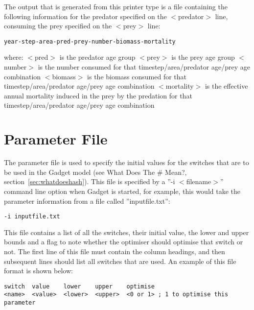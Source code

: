 \documentclass [a4paper, 10pt]{book}
\begin{document}
The output that is generated from this printer type is a file containing the following information for the predator specified on the $<$predator$>$ line, consuming the prey specified on the $<$prey$>$ line:

{\small\begin{verbatim}
year-step-area-pred-prey-number-biomass-mortality
\end{verbatim}}

where:\newline
$<$pred$>$ is the predator age group\newline
$<$prey$>$ is the prey age group\newline
$<$number$>$ is the number consumed for that timestep/area/predator age/prey age combination\newline
$<$biomass$>$ is the biomass consumed for that timestep/area/predator age/prey age combination\newline
$<$mortality$>$ is the effective annual mortality induced in the prey by the predation for that timestep/area/predator age/prey age combination

\chapter{Parameter File}\label{chap:param}
The parameter file is used to specify the initial values for the switches that are to be used in the Gadget model (see What Does The \# Mean?, section~\ref{sec:whatdoeshash}).  This file is specified by a ''-i $<$filename$>$'' command line option when Gadget is started, for example, this would take the parameter information from a file called ''inputfile.txt'':

{\small\begin{verbatim}
-i inputfile.txt
\end{verbatim}}

This file contains a list of all the switches, their initial value, the lower and upper bounds and a flag to note whether the optimiser should optimise that switch or not.  The first line of this file must contain the column headings, and then subsequent lines should list all switches that are used.  An example of this file format is shown below:

{\small\begin{verbatim}
switch  value    lower    upper    optimise
<name>  <value>  <lower>  <upper>  <0 or 1> ; 1 to optimise this parameter
\end{verbatim}}
\end{document}
